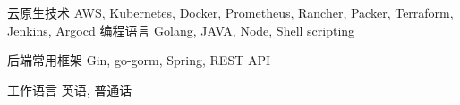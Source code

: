

\begin{cvskills}

  \cvskill
    {云原生技术} %
    {AWS, Kubernetes, Docker, Prometheus, Rancher, Packer, Terraform, Jenkins, Argocd} %
\cvskill
  {编程语言} %
  {Golang, JAVA, Node, Shell scripting} %

  \cvskill
    {后端常用框架} %
    {Gin, go-gorm, Spring, REST API} %




  \cvskill
    {工作语言} %
    {英语, 普通话} %

\end{cvskills}
